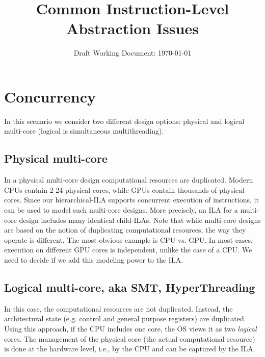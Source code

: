 \documentclass[letterpaper, 11 pt]{article}  %
\title{Common Instruction-Level Abstraction Issues}
\author{}
\date{Draft Working Document: \today}
\begin{document}
\maketitle

\providecommand{\bd}[0]{\mathbb{B}}
\providecommand{\st}[1]{\mathrm{#1}}
\providecommand{\ft}[1]{\mathtt{#1}}










\section*{Concurrency}

In this scenario we consider two different design options: physical and logical multi-core (logical is simultaneous multithreading). 
\subsection*{Physical multi-core} 
In a physical multi-core design computational resources are duplicated. 
Modern CPUs contain 2-24 physical cores, while GPUs contain thousands 
of physical cores. Since our hierarchical-ILA supports concurrent 
execution of instructions, it can be used to model such multi-core 
designs. More precisely, an ILA for a multi-core design includes 
many identical child-ILAs. Note that while multi-core designs are based 
on the notion of duplicating computational resources, the way they 
operate is different. The most obvious example is CPU vs. GPU. In most 
cases, execution on different GPU cores is independent, unlike the case 
of a CPU. We need to decide if we add this modeling power to the ILA.

\subsection*{Logical multi-core, aka SMT, HyperThreading}
In this case, the computational resources are not duplicated. 
Instead, the architectural state (e.g. control and general 
purpose registers) are duplicated. Using this approach, if 
the CPU includes one core, the OS views it as two \emph{logical}
 cores. The management of the physical core 
 (the actual computational resource) is done at the 
 hardware level, i.e., by the CPU and can be captured by the ILA.

%
%
\end{document}
